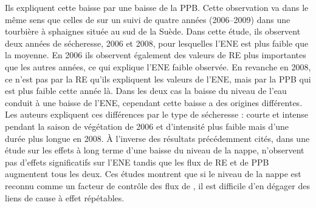 Ils expliquent cette baisse par une baisse de la PPB.
Cette observation va dans le même sens que celles de \citet{lund2012} sur un suivi de quatre années (2006--2009) dans une tourbière à sphaignes située au sud de la Suède. 
Dans cette étude, ils observent deux années de sécheresse, 2006 et 2008, pour lesquelles l'ENE est plus faible que la moyenne.
En 2006 ils observent également des valeurs de RE plus importantes que les autres années, ce qui explique l'ENE faible observée.
En revanche en 2008, ce n'est pas par la RE qu'ils expliquent les valeurs de l'ENE, mais par la PPB qui est plus faible cette année là.
Dans les deux cas la baisse du niveau de l'eau conduit à une baisse de l'ENE, cependant cette baisse a des origines différentes.
Les auteurs expliquent ces différences par le type de sécheresse : courte et intense pendant la saison de végétation de 2006 et d'intensité plus faible mais d'une durée plus longue en 2008.
À l'inverse des résultats précédemment cités, \citet{ballantyne2014} dans une étude sur les effets à long terme d'une baisse du niveau de la nappe, n'observent pas d'effets significatifs sur l'ENE tandis que les flux de RE et de PPB augmentent tous les deux.
Ces études montrent que si le niveau de la nappe est reconnu comme un facteur de contrôle des flux de \coo, il est difficile d'en dégager des liens de cause à effet répétables.

